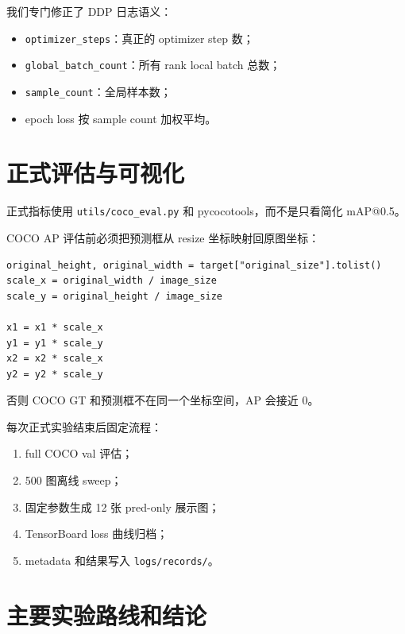 \documentclass[11pt,a4paper]{article}
\newcommand{\code}[1]{\texttt{#1}}
\begin{document}
我们专门修正了 DDP 日志语义：

\begin{itemize}
  \item \code{optimizer\_steps}：真正的 optimizer step 数；
  \item \code{global\_batch\_count}：所有 rank local batch 总数；
  \item \code{sample\_count}：全局样本数；
  \item epoch loss 按 sample count 加权平均。
\end{itemize}

\section{正式评估与可视化}

正式指标使用 \code{utils/coco\_eval.py} 和 pycocotools，而不是只看简化 mAP@0.5。

COCO AP 评估前必须把预测框从 resize 坐标映射回原图坐标：

\begin{Verbatim}[fontsize=\small]
original_height, original_width = target["original_size"].tolist()
scale_x = original_width / image_size
scale_y = original_height / image_size

x1 = x1 * scale_x
y1 = y1 * scale_y
x2 = x2 * scale_x
y2 = y2 * scale_y
\end{Verbatim}

否则 COCO GT 和预测框不在同一个坐标空间，AP 会接近 0。

每次正式实验结束后固定流程：

\begin{enumerate}[label=\arabic*.]
  \item full COCO val 评估；
  \item 500 图离线 sweep；
  \item 固定参数生成 12 张 pred-only 展示图；
  \item TensorBoard loss 曲线归档；
  \item metadata 和结果写入 \code{logs/records/}。
\end{enumerate}

\section{主要实验路线和结论}
\end{document}
